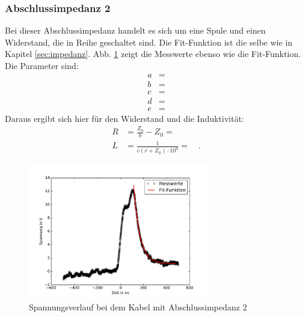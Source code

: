 \subsubsection{Abschlussimpedanz 2}
Bei dieser Abschlussimpedanz handelt es sich um eine Spule und einen Widerstand, die in Reihe geschaltet sind. Die Fit-Funktion ist die selbe wie in Kapitel \ref{sec:impedanz}. Abb. \ref{fig:box23} zeigt die Messwerte ebenso wie die Fit-Funktion. Die Parameter sind:
\begin{align}
	a &=  \\
	b &=  \\
	c &=  \\
	d &=  \\
	e &=  
\end{align}
Daraus ergibt sich hier für den Widerstand und die Induktivität:
\begin{align}
	R &= \frac{Z_0}{b} - Z_0 =  \\
	L &= \frac{1}{ c (r + Z_0) \cdot 10^9} =  \quad.
\end{align}

\begin{figure}
	\centering
	\includegraphics[width=0.7\textwidth]{Box23/Box23.pdf}
	\caption{Spannungsverlauf bei dem Kabel mit Abschlussimpedanz 2}
	\label{fig:box23}
\end{figure}

